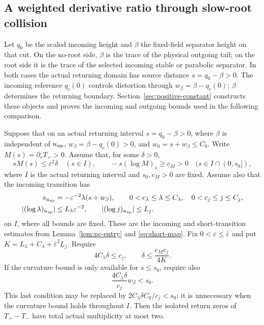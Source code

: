 \subsection{A weighted derivative ratio through slow-root collision}
\label{subsec:collision-comparison-core}
Let $q_0$ be the scaled incoming height and $\beta$ the fixed-field
separator height on that cut. On the no-root side, $\beta$ is the trace
of the physical outgoing tail; on the root side it is the trace of the
selected incoming stable or parabolic separator. In both cases the actual
returning domain has source distance $s=q_0-\beta>0$.
The incoming reference $q_c(0)$ controls distortion through
$w_\beta=\beta-q_c(0)$; $\beta$ determines the returning boundary.
Section~\ref{sec:positive-constant} constructs these objects and proves
the incoming and outgoing bounds used in the following comparison.

\begin{lemma}
\label{lem:pc-ratio}
Suppose that on an actual returning interval
$s=q_0-\beta>0$, where $\beta$ is independent of $u_{\rm up}$,
$w_\beta=\beta-q_c(0)>0$, and $w_0=s+w_\beta\le C_0$.
Write $M(s)=\partial_s T_+>0$. Assume that, for some $\delta>0$,
\begin{equation}
\label{eq:pc-outgoing-conditions}
 sM(s)\le\varepsilon^2\delta\quad(s\in I),\qquad
 -s(\log M)_s\ge c_M>0\quad(s\in I\cap(0,s_0]),
\end{equation}
where $I$ is the actual returning interval and $s_0,c_M>0$ are fixed.
Assume also that the incoming transition has
\begin{equation}
\label{eq:pc-entry-slope-for-ratio}
 \begin{aligned}
 s_{u_{\rm up}}&=-\varepsilon^{-2}\lambda(s+w_\beta),\qquad
 0<c_\lambda\le\lambda\le C_\lambda,\quad 0<c_j\le j\le C_j,\\
 |(\log\lambda)_{u_{\rm up}}|&\le L_\lambda\varepsilon^{-2},\qquad
 |(\log j)_{u_{\rm up}}|\le L_j.
 \end{aligned}
\end{equation}
on $I$, where all bounds are fixed. These are the incoming and
short-transition estimates from Lemma~\ref{lem:pc-entry} and
\eqref{eq:short-map}. Fix $0<\varepsilon\le\bar\varepsilon$ and put
$K=L_\lambda+C_\lambda+\bar\varepsilon^2L_j$. Require
\begin{equation}\label{eq:pc-ratio-smallness}
 4C_\lambda\delta\le c_j,\qquad
 \delta\le\frac{c_Mc_j}{4K}.
\end{equation}
If the curvature bound is only available for $s\le s_0$, require also
\begin{equation}\label{eq:pc-ratio-localization}
 \frac{4C_\lambda\delta}{c_j}w_\beta<s_0.
\end{equation}
This last condition may be replaced by
$2C_\lambda\delta C_0/c_j<s_0$; it is unnecessary when the curvature
bound holds throughout $I$. Then the isolated return zeros of $T_+-T_-$
have total actual multiplicity at most two.
\end{lemma}

